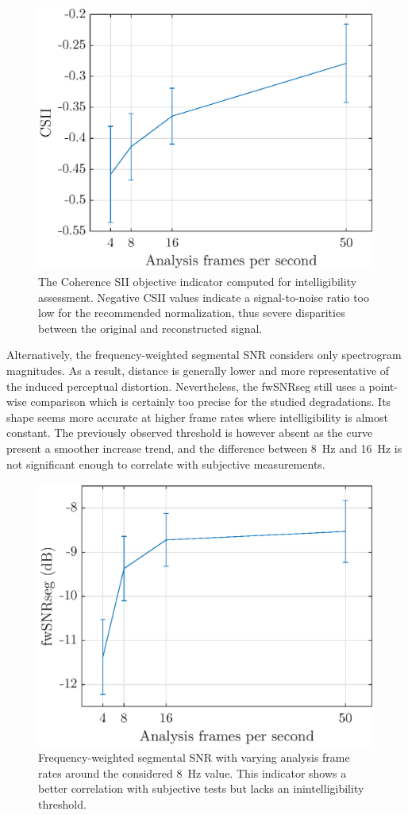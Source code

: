 \documentclass[12pt,times,onecolumn]{article}
\begin{document}
\begin{figure}[htbp]
	\centering
		\includegraphics[width=0.7\columnwidth]{figures/csii_tob_fps.eps}
	\caption{The Coherence SII objective indicator computed for intelligibility assessment. Negative CSII values indicate a signal-to-noise ratio too low for the recommended normalization, thus severe disparities between the original and reconstructed signal.}
	\label{fig:csii_tob_fps}
\end{figure}

Alternatively, the frequency-weighted segmental SNR considers only spectrogram magnitudes. As a result, distance is generally lower and more representative of the induced perceptual distortion. Nevertheless, the fwSNRseg still uses a point-wise comparison which is certainly too precise for the studied degradations. Its shape seems more accurate at higher frame rates where intelligibility is almost constant. The previously observed threshold is however absent as the curve present a smoother increase trend, and the difference between 8~Hz and 16~Hz is not significant enough to correlate with subjective measurements.\\

\begin{figure}[htbp]
	\centering
		\includegraphics[width=0.7\columnwidth]{figures/fwsnrseg_tob_fps.eps}
	\caption{Frequency-weighted segmental SNR with varying analysis frame rates around the considered 8~Hz value. This indicator shows a better correlation with subjective tests but lacks an inintelligibility threshold.}
	\label{fig:fwsnrseg_tob_fps}
\end{figure}
\end{document}
